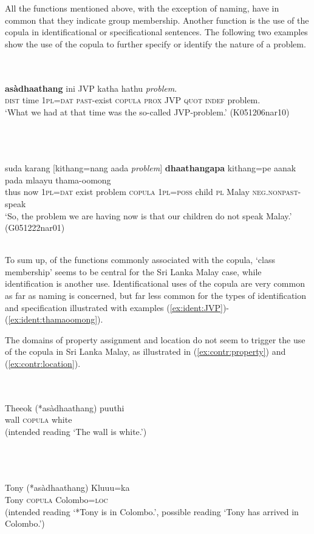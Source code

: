 \documentclass[a4paper,12pt]{article}
\newcommand{\xbox}[2]{\noindent\parbox[t]{#1}{#2}\noindent}
\newcommand{\xref}[1]{(\ref{#1})}
\newcommand{\ea}{\\\\}
\newcommand{\z}{\\\\}
\begin{document}
All the functions mentioned above, with the exception of naming, have in common that they indicate group membership. Another function is the use of the copula in identificational or specificational sentences. The following two examples show the use of the copula to further specify or identify the nature of a problem.

\xbox{\textwidth}{
\ea \label{ex:ident:JVP}
\gll [Itthu    vakthu kithang=nang nya-aada]     \textbf{asàdhaathang} ini      JVP katha hathu  {\em problem}. \\
     \textsc{dist} time \textsc{1pl}=\textsc{dat} \textsc{past}-exist \textsc{copula} \textsc{prox} JVP \textsc{quot} \textsc{indef} problem. \\
    `What we had at that time was the so-called JVP-problem.' (K051206nar10)
\z
}

\xbox{\textwidth}{
\ea\label{ex:ident:thamaoomong}
\gll suda karang [kithang=nang   aada  {\em problem}] \textbf{dhaathangapa} kithang=pe     aanak pada mlaayu thama-oomong \\
       thus now \textsc{1pl}=\textsc{dat} exist problem \textsc{copula} \textsc{1pl}=\textsc{poss} child \textsc{pl} Malay \textsc{neg.nonpast}-speak\\
    `So, the problem we are having now is that our children do not speak Malay.' (G051222nar01)
\z
} 

To sum up, of the functions commonly associated with the copula, `class membership' seems to be central for the Sri Lanka Malay case, while identification is another use. Identificational uses of the copula are very common as far as naming is concerned, but far less common for the types of identification and specification illustrated with examples \xref{ex:ident:JVP}-\xref{ex:ident:thamaoomong}.

The domains of property assignment and location do not seem to trigger the use of the copula in Sri Lanka Malay, as illustrated in \xref{ex:contr:property} and \xref{ex:contr:location}.

\xbox{\textwidth}{
\ea\label{ex:contr:property}
\gll Thee\umb ok (*asàdhaathang) puuthi \\
     wall \textsc{copula} white  \\
    (intended reading `The wall is white.')
\z
} 


\xbox{\textwidth}{
\ea\label{ex:contr:location}
\gll Tony (*asàdhaathang) Kluu\umb u=ka \\
      Tony \textsc{copula} Colombo=\textsc{loc} \\
    (intended reading `*Tony is in Colombo.', possible reading `Tony has arrived in Colombo.') 
\z
} 
\end{document}
